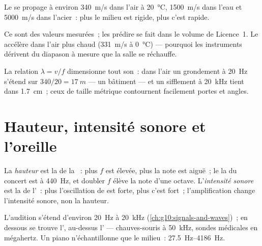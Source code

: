 \begin{proposition}\label{prop:g12:sound-acoustics:speed}
%
Le  se propage à environ \qty{340}{m/s} dans l'air à
\qty{20}{\degreeCelsius}, \qty{1500}{m/s} dans l'eau et
\qty{5000}{m/s} dans l'acier~: plus le milieu est rigide, plus c'est
rapide. \admitted
\end{proposition}

\begin{remark}\label{rem:g12:sound-acoustics:temperature}
Ce sont des valeurs mesurées~; les prédire se fait dans le volume de
Licence~1. Le  accélère dans l'air plus chaud (\qty{331}{m/s} à
\qty{0}{\degreeCelsius}) --- pourquoi les instruments dérivent du
diapason à mesure que la salle se réchauffe.
\end{remark}

\begin{example}\label{ex:g12:sound-acoustics:wavelengths}
La relation $\lambda = v/f$ dimensionne tout son~: dans l'air un
grondement à \qty{20}{Hz} s'étend sur $340/20 = \qty{17}{m}$ --- un
bâtiment --- et un sifflement à \qty{20}{kHz} tient dans \qty{1.7}{cm}~;
ceux de taille métrique contournent facilement portes et angles.
\end{example}

\section{Hauteur, intensité sonore et l'oreille}

\begin{definition}\label{def:g12:sound-acoustics:pitch-loudness}
La \emph{hauteur} est la  de la
~: plus $f$ est élevée, plus la note est aiguë~; le
la du concert est à \qty{440}{Hz}, et doubler $f$ élève la note d'une
octave. L'\emph{intensité sonore} est la
 de l'~: plus l'oscillation de
 est forte, plus c'est fort~; l'amplification change
l'intensité sonore, non la hauteur.
\end{definition}

\begin{remark}\label{rem:g12:sound-acoustics:audible}
L'audition s'étend d'environ \qty{20}{Hz} à \qty{20}{kHz}
(\cref{ch:g10:signals-and-waves})~; en dessous se trouve
l', au-dessus l' --- chauves-souris à
\qty{50}{kHz}, sondes médicales en mégahertz. Un piano n'échantillonne
que le milieu~: \qtyrange{27.5}{4186}{Hz}.
\end{remark}

